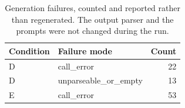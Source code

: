 \begin{table}[t]
\caption{Generation failures, counted and reported rather than regenerated. The output parser and the
prompts were not changed during the run.}
\label{tab:failures}
\centering
\begin{tabular}{llr}
\toprule
Condition & Failure mode & Count \\
\midrule
D & call\_error & 22 \\
D & unparseable\_or\_empty & 13 \\
E & call\_error & 53 \\
\bottomrule
\end{tabular}
\end{table}
